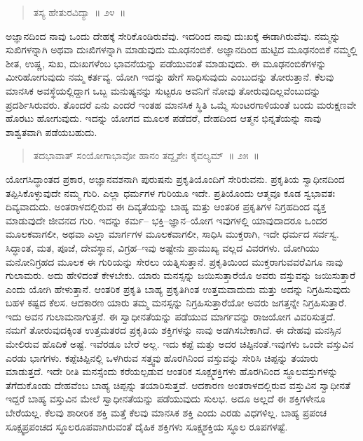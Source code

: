 \vspace{-0.3cm}

\begin{verse}
ತಸ್ಯ ಹೇತುರವಿದ್ಯಾ~॥ ೨೪~॥
\end{verse}

\vspace{-0.3cm}


ಅಜ್ಞಾನದಿಂದ ನಾವು ಒಂದು ದೇಹಕ್ಕೆ ಸೇರಿಕೊಂಡಿರುವೆವು. ಇದರಿಂದ ನಾವು ದುಃಖಕ್ಕೆ ಈಡಾಗಿರುವೆವು. ನಮ್ಮನ್ನು ಸುಖಿಗಳನ್ನಾಗಿ ಅಥವಾ ದುಃಖಿಗಳನ್ನಾಗಿ ಮಾಡುವುದು ಮೂಢನಂಬಿಕೆ. ಅಜ್ಞಾನದಿಂದ ಹುಟ್ಟಿದ ಮೂಢನಂಬಿಕೆ ನಮ್ಮಲ್ಲಿ ಶೀತ, ಉಷ್ಣ, ಸುಖ, ದುಃಖಗಳೆಂಬ ಭಾವನೆಯನ್ನು ಪಡೆಯುವಂತೆ ಮಾಡುವುದು. ಈ ಮೂಢನಂಬಿಕೆಗಳನ್ನು ಮೀರಿಹೋಗುವುದು ನಮ್ಮ ಕರ್ತವ್ಯ. ಯೋಗಿ ಇದನ್ನು ಹೇಗೆ ಸಾಧಿಸುವುದು ಎಂಬುದನ್ನು ತೋರುತ್ತಾನೆ. ಕೆಲವು ಮಾನಸಿಕ ಅವಸ್ಥೆಯಲ್ಲಿದ್ದಾಗ ಒಬ್ಬ ಮನುಷ್ಯನನ್ನು ಸುಟ್ಟರೂ ಅವನಿಗೆ ನೋವು ತೋರುವುದಿಲ್ಲವೆಂಬುದನ್ನು ಪ್ರದರ್ಶಿಸಿರುವರು. ತೊಂದರೆ ಏನು ಎಂದರೆ ಇಂತಹ ಮಾನಸಿಕ ಸ್ಥಿತಿ ಒಮ್ಮೆ ಸುಂಟರಗಾಳಿಯಂತೆ ಬಂದು ಮರುಕ್ಷಣವೇ ಹೊರಟು ಹೋಗುವುದು. ಇದನ್ನು ಯೋಗದ ಮೂಲಕ ಪಡೆದರೆ, ದೇಹದಿಂದ ಆತ್ಮನ ಭಿನ್ನತೆಯನ್ನು ನಾವು ಶಾಶ್ವತವಾಗಿ ಪಡೆಯಬಹುದು. 

\vspace{-0.3cm}

\begin{verse}
ತದಭಾವಾತ್​ ಸಂಯೋಗಾಭಾವೋ ಹಾನಂ ತದ್ದೃಶೇಃ ಕೈವಲ್ಯಮ್​~॥ ೨೫~॥
\end{verse}

\vspace{-0.3cm}



\vskip 0.2cm

ಯೋಗಸಿದ್ಧಾಂತದ ಪ್ರಕಾರ, ಅಜ್ಞಾನವಶನಾಗಿ ಪುರುಷನು ಪ್ರಕೃತಿಯೊಂದಿಗೆ ಸೇರಿರುವನು. ಪ್ರಕೃತಿಯ ಸ್ವಾಧೀನದಿಂದ ತಪ್ಪಿಸಿಕೊಳ್ಳುವುದೇ ನಮ್ಮ ಗುರಿ. ಎಲ್ಲಾ ಧರ್ಮಗಳ ಗುರಿಯೂ ಇದೇ. ಪ್ರತಿಯೊಂದು ಆತ್ಮವೂ ಕೂಡ ಸ್ವಭಾವತಃ ದಿವ್ಯವಾದುದು. ಅಂತರಾಳದಲ್ಲಿರುವ ಈ ದಿವ್ಯತೆಯನ್ನು ಬಾಹ್ಯ ಮತ್ತು ಆಂತರಿಕ ಪ್ರಕೃತಿಗಳ ನಿಗ್ರಹದಿಂದ ವ್ಯಕ್ತ ಮಾಡುವುದೇ ಜೀವನದ ಗುರಿ. ಇದನ್ನು ಕರ್ಮ– ಭಕ್ತಿ–ಜ್ಞಾನ–ಯೋಗ ಇವುಗಳಲ್ಲಿ ಯಾವುದಾದರೂ ಒಂದರ ಮೂಲಕವಾಗಲೀ, ಅಥವಾ ಎಲ್ಲಾ ಮಾರ್ಗಗಳ ಮೂಲಕವಾಗಲೀ, ಸಾಧಿಸಿ ಮುಕ್ತರಾಗಿ, ಇದೇ ಧರ್ಮದ ಸರ್ವಸ್ವ. ಸಿದ್ಧಾಂತ, ಮತ, ಪೂಜೆ, ದೇವಸ್ಥಾನ, ವಿಗ್ರಹ–ಇವು ಅಷ್ಟೇನು ಪ್ರಾಮುಖ್ಯ ವಲ್ಲದ ವಿವರಗಳು. ಯೋಗಿಯು ಮನೋನಿಗ್ರಹದ ಮೂಲಕ ಈ ಗುರಿಯನ್ನು ಸೇರಲು ಯತ್ನಿಸುತ್ತಾನೆ. ಪ್ರಕೃತಿಯಿಂದ ಮುಕ್ತರಾಗುವವರೆವಿಗೂ ನಾವು ಗುಲಾಮರು. ಅದು ಹೇಳಿದಂತೆ ಕೇಳಬೇಕು. ಯಾರು ಮನಸ್ಸನ್ನು ಜಯಿಸುತ್ತಾರೆಯೊ ಅವರು ವಸ್ತುವನ್ನು ಜಯಿಸುತ್ತಾರೆ ಎಂದು ಯೋಗಿ ಹೇಳುತ್ತಾನೆ. ಆಂತರಿಕ ಪ್ರಕೃತಿ ಬಾಹ್ಯ ಪ್ರಕೃತಿಗಿಂತ ಉತ್ತಮವಾದುದು ಮತ್ತು ಅದನ್ನು ನಿಗ್ರಹಿಸುವುದು ಬಹಳ ಕಷ್ಟದ ಕೆಲಸ. ಆದಕಾರಣ ಯಾರು ತಮ್ಮ ಮನಸ್ಸನ್ನು ನಿಗ್ರಹಿಸುತ್ತಾರೆಯೋ ಅವರು ಜಗತ್ತನ್ನೇ ನಿಗ್ರಹಿಸುತ್ತಾರೆ. ಇದು ಅವನ ಗುಲಾಮನಾಗುತ್ತನೆ. ಈ ಸ್ವಾಧೀನತೆಯನ್ನು ಪಡೆಯುವ ಮಾರ್ಗವನ್ನು ರಾಜಯೋಗ ವಿವರಿಸುತ್ತದೆ. ನಮಗೆ ತೋರುವುದಕ್ಕಿಂತ ಉತ್ತಮತರದ ಪ್ರಕೃತಿಯ ಶಕ್ತಿಗಳನ್ನು ನಾವು ಅಡಗಿಸಬೇಕಾಗಿದೆ. ಈ ದೇಹವು ಮನಸ್ಸಿನ ಮೇಲಿರುವ ಹೊದಿಕೆ ಅಷ್ಟೆ. ಇವೆರಡೂ ಬೇರೆ ಅಲ್ಲ. ಇದು ಕಪ್ಪೆ ಮತ್ತು ಅದರ ಚಿಪ್ಪಿನಂತೆ.\break ಇವುಗಳು ಒಂದೇ ವಸ್ತುವಿನ ಎರಡು ಭಾಗಗಳು. ಕಪ್ಪೆಚಿಪ್ಪಿನಲ್ಲಿ ಒಳಗಿರುವ ಸತ್ತ್ವವು ಹೊರಗಿನಿಂದ ವಸ್ತುವನ್ನು ಸೇರಿಸಿ ಚಿಪ್ಪನ್ನು ತಯಾರು ಮಾಡುತ್ತದೆ. ಇದೇ ರೀತಿ ಮನಸ್ಸೆಂದು ಕರೆಯಲ್ಪಡುವ ಆಂತರಿಕ ಸೂಕ್ಷ್ಮಶಕ್ತಿಗಳು ಹೊರಗಿನಿಂದ ಸ್ಥೂಲವಸ್ತುಗಳನ್ನು ತೆಗೆದುಕೊಂಡು ದೇಹವೆಂಬ ಬಾಹ್ಯ ಚಿಪ್ಪನ್ನು ತಯಾರಿಸುತ್ತವೆ. ಆದಕಾರಣ ಅಂತರಾಳದಲ್ಲಿರುವ ವಸ್ತುವಿನ ಸ್ವಾಧೀನತೆ ಇದ್ದರೆ ಬಾಹ್ಯ ವಸ್ತುವಿನ ಮೇಲೆ ಸ್ವಾಧೀನತೆಯನ್ನು ಪಡೆಯುವುದು ಸುಲಭ. ಅದೂ ಅಲ್ಲದೆ ಈ ಶಕ್ತಿಗಳೇನೂ ಬೇರೆಯಲ್ಲ. ಕೆಲವು ಶಾರೀರಿಕ ಶಕ್ತಿ ಮತ್ತೆ ಕೆಲವು ಮಾನಸಿಕ ಶಕ್ತಿ ಎಂದು ಎರಡು ವಿಧಗಳಿಲ್ಲ. ಬಾಹ್ಯ ಪ್ರಪಂಚ ಸೂಕ್ಷ್ಮಪ್ರಪಂಚದ ಸ್ಥೂಲರೂಪವಾಗಿರುವಂತೆ ದೈಹಿಕ ಶಕ್ತಿಗಳು ಸೂಕ್ಷ್ಮಶಕ್ತಿಯ ಸ್ಥೂಲ ರೂಪಗಳಷ್ಟೆ. 

